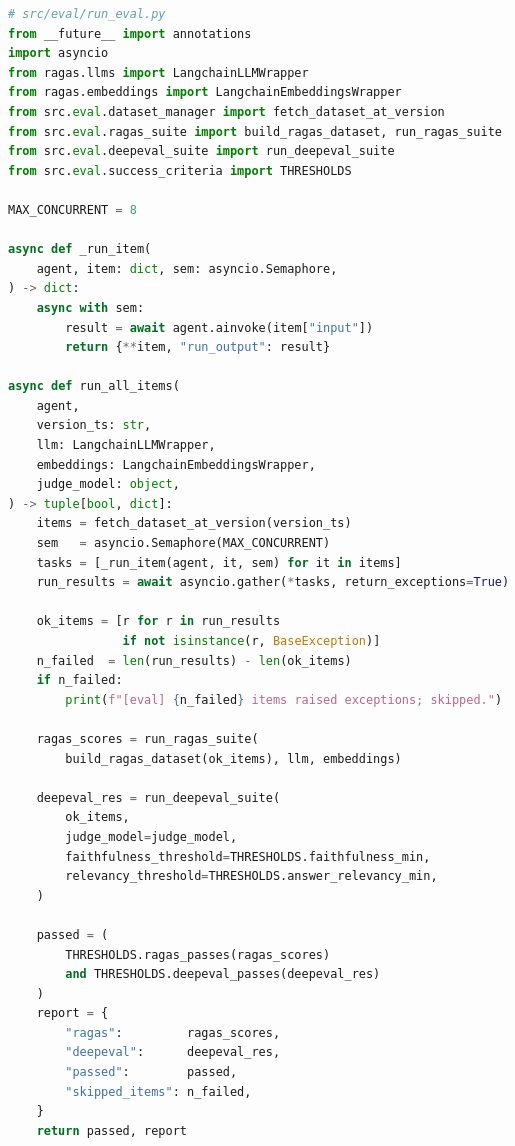 \begin{lstlisting}[language=Python, caption={Evaluation runner: concurrent
    agent invocation with bounded parallelism},
    label={lst:eval-runner}]
# src/eval/run_eval.py
from __future__ import annotations
import asyncio
from ragas.llms import LangchainLLMWrapper
from ragas.embeddings import LangchainEmbeddingsWrapper
from src.eval.dataset_manager import fetch_dataset_at_version
from src.eval.ragas_suite import build_ragas_dataset, run_ragas_suite
from src.eval.deepeval_suite import run_deepeval_suite
from src.eval.success_criteria import THRESHOLDS

MAX_CONCURRENT = 8

async def _run_item(
    agent, item: dict, sem: asyncio.Semaphore,
) -> dict:
    async with sem:
        result = await agent.ainvoke(item["input"])
        return {**item, "run_output": result}

async def run_all_items(
    agent,
    version_ts: str,
    llm: LangchainLLMWrapper,
    embeddings: LangchainEmbeddingsWrapper,
    judge_model: object,
) -> tuple[bool, dict]:
    items = fetch_dataset_at_version(version_ts)
    sem   = asyncio.Semaphore(MAX_CONCURRENT)
    tasks = [_run_item(agent, it, sem) for it in items]
    run_results = await asyncio.gather(*tasks, return_exceptions=True)

    ok_items = [r for r in run_results
                if not isinstance(r, BaseException)]
    n_failed  = len(run_results) - len(ok_items)
    if n_failed:
        print(f"[eval] {n_failed} items raised exceptions; skipped.")

    ragas_scores = run_ragas_suite(
        build_ragas_dataset(ok_items), llm, embeddings)

    deepeval_res = run_deepeval_suite(
        ok_items,
        judge_model=judge_model,
        faithfulness_threshold=THRESHOLDS.faithfulness_min,
        relevancy_threshold=THRESHOLDS.answer_relevancy_min,
    )

    passed = (
        THRESHOLDS.ragas_passes(ragas_scores)
        and THRESHOLDS.deepeval_passes(deepeval_res)
    )
    report = {
        "ragas":         ragas_scores,
        "deepeval":      deepeval_res,
        "passed":        passed,
        "skipped_items": n_failed,
    }
    return passed, report
\end{lstlisting}

